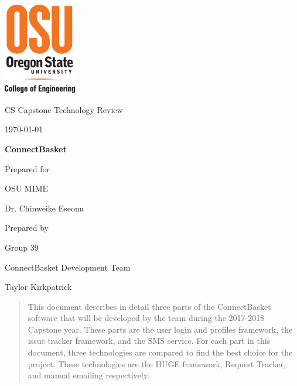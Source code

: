 \documentclass[onecolumn, draftclsnofoot,10pt, compsoc]{IEEEtran}
\def \CapstoneTeamName{		ConnectBasket Development Team}
\def \CapstoneTeamNumber{		39}
\def \GroupMemberOne{			Taylor Kirkpatrick}
\def \CapstoneProjectName{		ConnectBasket}
\def \CapstoneSponsorCompany{	OSU MIME}
\def \CapstoneSponsorPerson{		Dr. Chinweike Eseonu}
\def \DocType{		%
				Technology Review
				}
\newcommand{\NameSigPair}[1]{\par
\makebox[2.75in][r]{#1} \hfil 	\makebox[3.25in]{\makebox[2.25in]{\hrulefill} \hfill		\makebox[.75in]{\hrulefill}}
\par\vspace{-12pt} \textit{\tiny\noindent
\makebox[2.75in]{} \hfil		\makebox[3.25in]{\makebox[2.25in][r]{Signature} \hfill	\makebox[.75in][r]{Date}}}}
\renewcommand{\NameSigPair}[1]{#1}
\begin{document}
\begin{titlepage}
    \begin{singlespace}
    	\includegraphics[height=4cm]{coe_v_spot1}
        \hfill 
        \par\vspace{.2in}
        \centering
        \scshape{
            \huge CS Capstone \DocType \par
            {\large\today}\par
            \vspace{.5in}
            \textbf{\Huge\CapstoneProjectName}\par
            \vfill
            {\large Prepared for}\par
            \Huge \CapstoneSponsorCompany\par
            \vspace{5pt}
            {\Large\NameSigPair{\CapstoneSponsorPerson}\par}
            {\large Prepared by }\par
            Group\CapstoneTeamNumber\par
            \CapstoneTeamName\par 
            \vspace{5pt}
            {\Large
                \NameSigPair{\GroupMemberOne}\par
            }
            \vspace{20pt}
        }
        \begin{abstract}
        This document describes in detail three parts of the ConnectBasket software that will be developed by the team 
		during the 2017-2018 Capstone year. These parts are the user login and profiles framework, the issue tracker 
		framework, and the SMS service. For each part in this document, three technologies are compared to find the best 
		choice for the project. These technologies are the HUGE framework, Request Tracker, and manual emailing respectively.
        \end{abstract}     
    \end{singlespace}
\end{titlepage}
\newpage
{}
\tableofcontents
\clearpage
\end{document}
